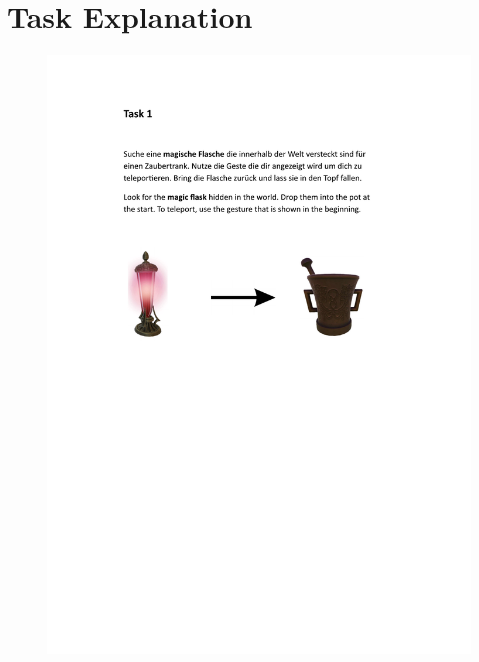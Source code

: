 \section{Task Explanation}
\begin{figure}[hbt!]
\centering
\includegraphics[width=\textwidth]{figures/Appendix/task explaination.pdf}
\end{figure}

